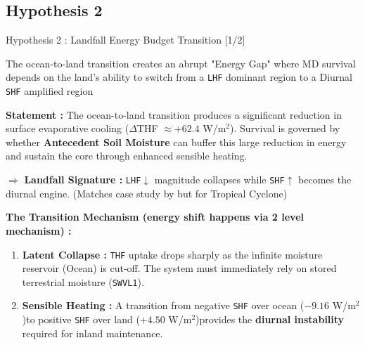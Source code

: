 \documentclass[8pt, aspectratio=169]{beamer}
\begin{document}
\subsection{Hypothesis 2}
\begin{frame}{Hypothesis 2 : Landfall Energy Budget Transition [1/2]}
    \vspace{-0.1cm}
    \begin{block}{The ocean-to-land transition creates an abrupt "Energy Gap" where MD survival depends on the land's ability to switch from a \texttt{LHF} dominant region to a Diurnal \texttt{SHF} amplified region}\end{block}

    \vspace{0.15cm}
    \footnotesize
    \textbf{Statement :} The ocean-to-land transition produces a significant reduction in surface evaporative cooling ($\Delta$THF $\approx +62.4$ W/m$^2$)\footnotemark[7]. Survival is governed by whether \textbf{Antecedent Soil Moisture} can buffer this large reduction in energy and sustain the core through enhanced sensible heating.

    \vspace{0.2cm}
    \footnotesize
    $\Rightarrow$ \textbf{Landfall Signature :} \texttt{LHF}$\downarrow$ magnitude collapses while \texttt{SHF}$\uparrow$ becomes the diurnal engine. (Matches case study by \cite{andersen2014insights} but for Tropical Cyclone)

    \vspace{0.2cm}
    \footnotesize
    \textbf{The Transition Mechanism (energy shift happens via 2 level mechanism) :}
    \begin{enumerate}
        \item \textbf{Latent Collapse :} \texttt{THF} uptake drops sharply as the infinite moisture reservoir (Ocean) is cut-off. The system must immediately rely on stored terrestrial moisture (\texttt{SWVL1}).
        \item \textbf{Sensible Heating :} A transition from negative \texttt{SHF} over ocean ($-9.16$ W/m$^2$)\footnotemark[6] to positive \texttt{SHF} over land ($+4.50$ W/m$^2$)\footnotemark[6] provides the \textbf{diurnal instability} required for inland maintenance.
    \end{enumerate}


\end{frame}
\end{document}
